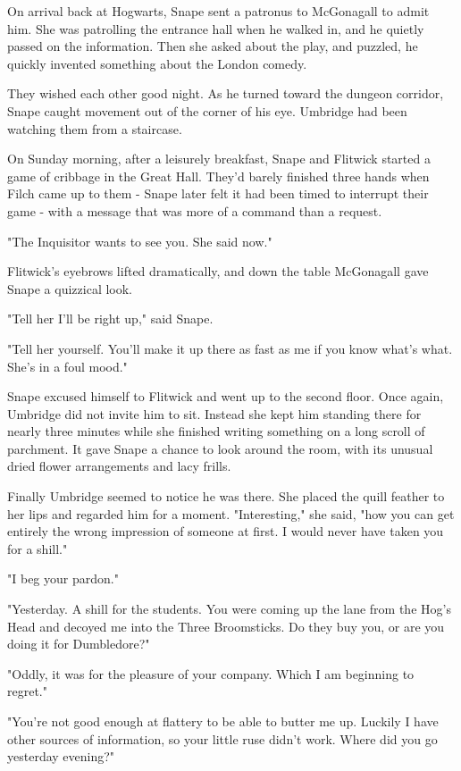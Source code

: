 On arrival back at Hogwarts, Snape sent a patronus to McGonagall to admit him. She was patrolling the entrance hall when he walked in, and he quietly passed on the information. Then she asked about the play, and puzzled, he quickly invented something about the London comedy.

They wished each other good night. As he turned toward the dungeon corridor, Snape caught movement out of the corner of his eye. Umbridge had been watching them from a staircase.

On Sunday morning, after a leisurely breakfast, Snape and Flitwick started a game of cribbage in the Great Hall. They'd barely finished three hands when Filch came up to them - Snape later felt it had been timed to interrupt their game - with a message that was more of a command than a request.

"The Inquisitor wants to see you. She said now."

Flitwick's eyebrows lifted dramatically, and down the table McGonagall gave Snape a quizzical look.

"Tell her I'll be right up," said Snape.

"Tell her yourself. You'll make it up there as fast as me if you know what's what. She's in a foul mood."

Snape excused himself to Flitwick and went up to the second floor. Once again, Umbridge did not invite him to sit. Instead she kept him standing there for nearly three minutes while she finished writing something on a long scroll of parchment. It gave Snape a chance to look around the room, with its unusual dried flower arrangements and lacy frills.

Finally Umbridge seemed to notice he was there. She placed the quill feather to her lips and regarded him for a moment. "Interesting," she said, "how you can get entirely the wrong impression of someone at first. I would never have taken you for a shill."

"I beg your pardon."

"Yesterday. A shill for the students. You were coming up the lane from the Hog's Head and decoyed me into the Three Broomsticks. Do they buy you, or are you doing it for Dumbledore?"

"Oddly, it was for the pleasure of your company. Which I am beginning to regret."

"You're not good enough at flattery to be able to butter me up. Luckily I have other sources of information, so your little ruse didn't work. Where did you go yesterday evening?"

